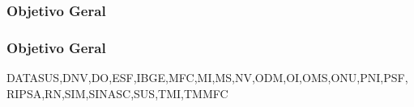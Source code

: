 	\lipsum[2]
\subsubsection{Objetivo Geral}
	\lipsum[2]
	
\subsubsection{Objetivo Geral}
	\lipsum[2]
	\acrlong{DATASUS},\acrlong{DNV},\acrlong{DO},\acrlong{ESF},\acrlong{IBGE},\acrlong{MFC},\acrlong{MI},\acrlong{MS},\acrlong{NV},\acrlong{ODM},\acrlong{OI},\acrlong{OMS},\acrlong{ONU},\acrlong{PNI},\acrlong{PSF},\acrlong{RIPSA},\acrlong{RN},\acrlong{SIM},\acrlong{SINASC},\acrlong{SUS},\acrlong{TMI},\acrlong{TMMFC}
	